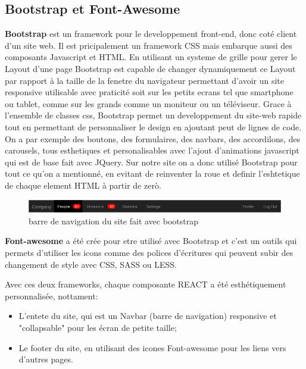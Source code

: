 \documentclass[a4paper,12pt]{report}
\theoremstyle{break}
\theoremstyle{break}
\theoremstyle{break}
\theoremstyle{break}
\theoremstyle{definition}
\theoremstyle{remark}
\begin{document}
\subsection{Bootstrap et Font-Awesome}
\textbf{Bootstrap} est un framework pour le developpement front-end, donc coté client d'un site web.
Il est pricipalement un framework CSS mais embarque aussi des composants Javascript et HTML.
En utilisant un systeme de grille pour gerer le Layout d'une page Bootstrap est capable de changer dynamiquement
ce Layout par rapport à la taille de la fenetre du navigateur permettant d'avoir un site responsive utilisable
avec praticité soit sur les petits ecrans tel que smartphone ou tablet, comme sur les grands comme un moniteur ou un téléviseur.
Grace à l'ensemble de classes css, Bootstrap permet un developpement du site-web rapide tout en permettant de personnaliser le design
en ajoutant peut de lignes de code. On a par exemple des boutons, des formulaires, des navbars,
des accordilons, des carousels, tous esthetiques et personalisables avec l'ajout d'animations javascript qui est de base fait avec
JQuery.
Sur notre site on a donc utilisé Bootstrap pour tout ce qu'on a mentionné, en evitant de reinventer la roue et definir
l'eshtetique de chaque element HTML à partir de zerò.
\begin{figure}[!ht]
  \centering
  \includegraphics[scale=0.6]{images/bootstrap1.png}
  \caption{barre de navigation du site fait avec bootstrap}
  \label{fig:modele_EA}
\end{figure}
\textbf{Font-awesome} a été crée pour etre utilisé avec Bootstrap et c'est un outils qui permets d'utiliser les icons comme des polices d'écritures
qui peuvent subir des changement de style avec CSS, SASS ou LESS.

Avec ces deux frameworks, chaque composante REACT a été esthétiquement personnalisée, nottament:
\begin{itemize}
  \item L'entete du site, qui est un Navbar (barre de navigation) responsive et "collapsable" pour les écran de petite taille;
  \item Le footer du site, en utilisant des icones Font-awesome pour les liens vers d'autres pages.
\end{itemize}

\end{document}
